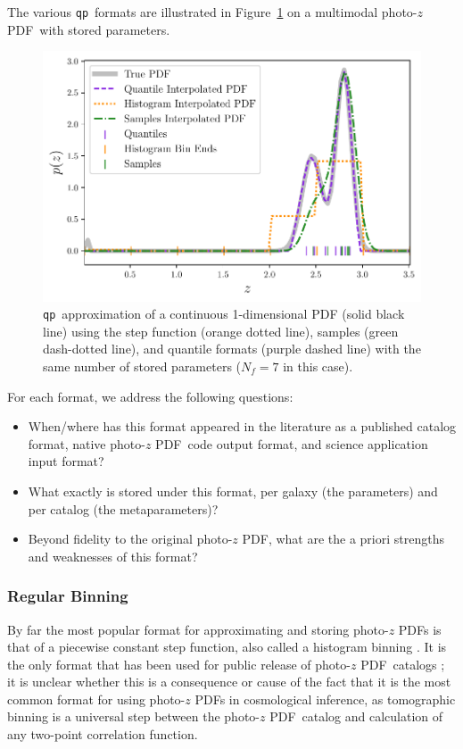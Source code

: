 \documentclass[\docopts]{\docclass}
\newcommand{\qp}{\texttt{qp}}
\newcommand{\pz}{photo-$z$ PDF}
\begin{document}
The various \qp\ formats are illustrated in Figure~\ref{fig:qp} on a multimodal 
\pz\ with stored parameters.
\begin{figure}
  \begin{center}
    \includegraphics[width=\columnwidth]{figures/demo_pz.pdf}
    \caption{\qp\ approximation of a continuous 1-dimensional PDF (solid black 
line) using the step function (orange dotted line), samples (green dash-dotted 
line), and quantile formats (purple dashed line) with the same number of stored 
parameters ($N_{f}=7$ in this case).
    \label{fig:qp}}
  \end{center}
\end{figure}
For each format, we address the following questions:
\begin{itemize}
  \item When/where has this format appeared in the literature as a published 
catalog format, native \pz\ code output format, and science application input 
format?
  \item What exactly is stored under this format, per galaxy (the parameters) 
and per catalog (the metaparameters)?
  \item Beyond fidelity to the original \pz, what are the a priori strengths 
and weaknesses of this format?
\end{itemize}

\subsubsection{Regular Binning}
\label{sec:bins}

By far the most popular format for approximating and storing \pz s is that of a 
piecewise constant step function, also called a histogram binning 
\citep{carrasco_kind_somz:_2014, sadeh_annz2:_2016, cavuoti_metaphor:_2017}.
It is the only format that has been used for public release of \pz\ catalogs 
\citep{sheldon_photometric_2012, tanaka_photometric_2017, jong_third_2017}; it 
is unclear whether this is a consequence or cause of the fact that it is the 
most common format for using \pz s in cosmological inference, as tomographic 
binning is a universal step between the \pz\ catalog and calculation of any 
two-point correlation function.
\end{document}
